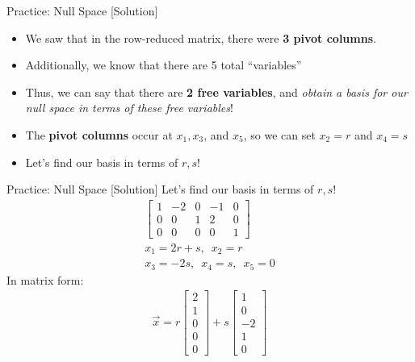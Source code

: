 \begin{frame}{Practice: Null Space [Solution]}
    \begin{itemize}
        \item We saw that in the row-reduced matrix, there were \textbf{3 pivot columns}.  
        \item Additionally, we know that there are 5 total “variables” 
        \item Thus, we can say that there are \textbf{2 free variables}, and \textit{obtain a basis for our null space in terms of these free variables}!
        \item The \textbf{pivot columns} occur at $x_1, x_3$, and $x_5$, so we can set $x_2 = r$ and $x_4 = s$
        \item Let's find our basis in terms of $r, s$!
    \end{itemize}
\end{frame}

\begin{frame}{Practice: Null Space [Solution]}
    Let's find our basis in terms of $r, s$!
    \begin{align*}
        \begin{bmatrix}
            1 & -2 & 0 & -1 & 0 \\
            0 & 0 & 1 & 2 & 0 \\
            0 & 0 & 0 & 0 & 1
        \end{bmatrix} \\
        x_1 = 2r + s, \,\,\, x_2 = r \\
        x_3 = -2s, \,\,\, x_4 = s, \,\,\, x_5 = 0
    \end{align*}
    In matrix form:
    \begin{align*}
        \vec{x} = r \begin{bmatrix}
            2 \\ 1 \\ 0 \\ 0 \\ 0
        \end{bmatrix} + s \begin{bmatrix}
            1 \\ 0 \\ -2 \\ 1 \\ 0
        \end{bmatrix}
    \end{align*}

\end{frame}